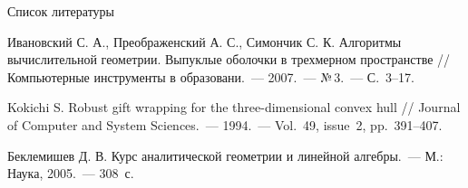 \documentclass[]{beamer} %
\begin{document}
\begin{frame}{Список литературы}
    \begin{thebibliography}{9}
         Ивановский С. А., Преображенский А. С., Симончик С. К. Алгоритмы вычислительной геометрии. Выпуклые оболочки в трехмерном пространстве // Компьютерные инструменты в образовани.~--- 2007.~--- №\,3.~--- С.~3--17.

         Kokichi S. Robust gift wrapping for the three-dimensional convex hull // Journal of Computer and System Sciences.~--- 1994.~--- Vol.~49, issue~2, pp.~391--407.

         Беклемишев Д. В. Курс аналитической геометрии и линейной алгебры.~--- М.: Наука, 2005.~--- 308~с.
        \end{thebibliography}
\end{frame}
\end{document}
